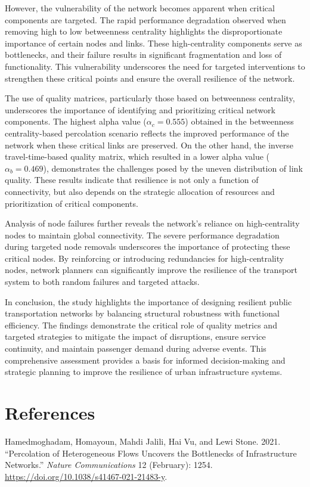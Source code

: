 \documentclass[
  letterpaper,
  DIV=11,
  numbers=noendperiod]{scrartcl}
\newlength{\cslhangindent}
\newenvironment{CSLReferences}[2] %
 {\begin{list}{}{%
  \setlength{\itemindent}{0pt}
  \setlength{\leftmargin}{0pt}
  \setlength{\parsep}{0pt}
  \ifodd #1
   \setlength{\leftmargin}{\cslhangindent}
   \setlength{\itemindent}{-1\cslhangindent}
  \fi
  \setlength{\itemsep}{#2\baselineskip}}}
 {\end{list}}
\begin{document}
However, the vulnerability of the network becomes apparent when critical
components are targeted. The rapid performance degradation observed when
removing high to low betweenness centrality highlights the
disproportionate importance of certain nodes and links. These
high-centrality components serve as bottlenecks, and their failure
results in significant fragmentation and loss of functionality. This
vulnerability underscores the need for targeted interventions to
strengthen these critical points and ensure the overall resilience of
the network.

The use of quality matrices, particularly those based on betweenness
centrality, underscores the importance of identifying and prioritizing
critical network components. The highest alpha value
(\(\alpha_c = 0.555\)) obtained in the betweenness centrality-based
percolation scenario reflects the improved performance of the network
when these critical links are preserved. On the other hand, the inverse
travel-time-based quality matrix, which resulted in a lower alpha value
(\(\alpha_b = 0.469\)), demonstrates the challenges posed by the uneven
distribution of link quality. These results indicate that resilience is
not only a function of connectivity, but also depends on the strategic
allocation of resources and prioritization of critical components.

Analysis of node failures further reveals the network's reliance on
high-centrality nodes to maintain global connectivity. The severe
performance degradation during targeted node removals underscores the
importance of protecting these critical nodes. By reinforcing or
introducing redundancies for high-centrality nodes, network planners can
significantly improve the resilience of the transport system to both
random failures and targeted attacks.

In conclusion, the study highlights the importance of designing
resilient public transportation networks by balancing structural
robustness with functional efficiency. The findings demonstrate the
critical role of quality metrics and targeted strategies to mitigate the
impact of disruptions, ensure service continuity, and maintain passenger
demand during adverse events. This comprehensive assessment provides a
basis for informed decision-making and strategic planning to improve the
resilience of urban infrastructure systems.

\section{References}\label{references}

\label{refs}
\begin{CSLReferences}{1}{0}
Hamedmoghadam, Homayoun, Mahdi Jalili, Hai Vu, and Lewi Stone. 2021.
{``Percolation of Heterogeneous Flows Uncovers the Bottlenecks of
Infrastructure Networks.''} \emph{Nature Communications} 12 (February):
1254. \url{https://doi.org/10.1038/s41467-021-21483-y}.

\end{CSLReferences}
\end{document}
